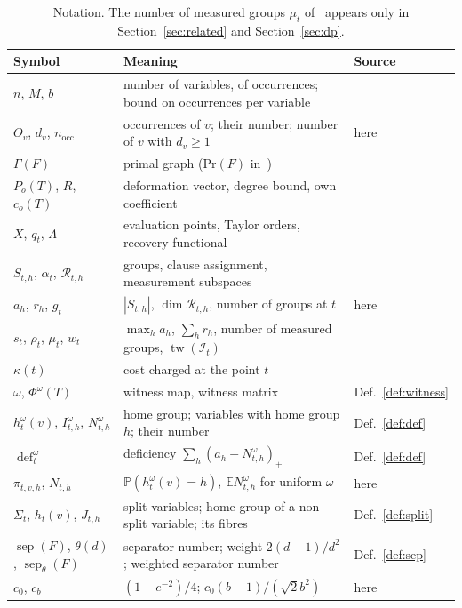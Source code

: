 \documentclass[11pt,a4paper]{article}
\theoremstyle{definition}
\theoremstyle{remark}
\newcommand{\E}{\mathbb{E}}
\newcommand{\PP}{\mathbb{P}}
\newcommand{\cR}{\mathcal{R}}
\newcommand{\cI}{\mathcal{I}}
\newcommand{\sep}{\operatorname{sep}}
\newcommand{\sepw}{\operatorname{sep}_{\theta}}
\newcommand{\dfc}{\operatorname{def}}
\newcommand{\tw}{\operatorname{tw}}
\newcommand{\Gr}{\Gamma}
\newcommand{\nocc}{n_{\mathrm{occ}}}
\newcommand{\Nbar}{\overline{N}}
\begin{document}
\begin{table}[t]
\centering
\small
\begin{tabular}{@{}>{\raggedright\arraybackslash}p{3.1cm}>{\raggedright\arraybackslash}p{9.6cm}l@{}}
\toprule
Symbol & Meaning & Source\\
\midrule
$n$, $M$, $b$ & number of variables, of occurrences; bound on occurrences per variable & \cite{DL}\\
$O_v$, $d_v$, $\nocc$ & occurrences of $v$; their number; number of $v$ with $d_v\ge1$ & here\\
$\Gr(F)$ & primal graph ($\mathrm{Pr}(F)$ in~\cite{DL}) & \cite{DL}\\
$P_o(T)$, $R$, $c_o(T)$ & deformation vector, degree bound, own coefficient & \cite{DL}\\
$X$, $q_t$, $\Lambda$ & evaluation points, Taylor orders, recovery functional & \cite{DL}\\
$S_{t,h}$, $\alpha_t$, $\cR_{t,h}$ & groups, clause assignment, measurement subspaces & \cite{DL}\\
$a_h$, $r_h$, $g_t$ & $|S_{t,h}|$, $\dim\cR_{t,h}$, number of groups at $t$ & here\\
$s_t$, $\rho_t$, $\mu_t$, $w_t$ & $\max_ha_h$, $\sum_hr_h$, number of measured groups, $\tw(\cI_t)$ & \cite{DL}\\
$\kappa(t)$ & cost charged at the point $t$ & \cite{DL}\\
$\omega$, $\Phi^\omega(T)$ & witness map, witness matrix & Def.~\ref{def:witness}\\
$h^\omega_t(v)$, $I^\omega_{t,h}$, $N^\omega_{t,h}$ & home group; variables with home group $h$; their number & Def.~\ref{def:def}\\
$\dfc^\omega_t$ & deficiency $\sum_h(a_h-N^\omega_{t,h})_+$ & Def.~\ref{def:def}\\
$\pi_{t,v,h}$, $\Nbar_{t,h}$ & $\PP(h^\omega_t(v)=h)$, $\E N^\omega_{t,h}$ for uniform $\omega$ & here\\
$\Sigma_t$, $h_t(v)$, $J_{t,h}$ & split variables; home group of a non-split variable; its fibres & Def.~\ref{def:split}\\
$\sep(F)$, $\theta(d)$, $\sepw(F)$ & separator number; weight $2(d-1)/d^2$; weighted separator number & Def.~\ref{def:sep}\\
$c_0$, $c_b$ & $(1-e^{-2})/4$; $c_0(b-1)/(\sqrt2b^2)$ & here\\
\bottomrule
\end{tabular}
\caption{Notation. The number of measured groups $\mu_t$ of~\cite{DL} appears only in
Section~\ref{sec:related} and Section~\ref{sec:dp}.}\label{tab:notation}
\end{table}
\end{document}
